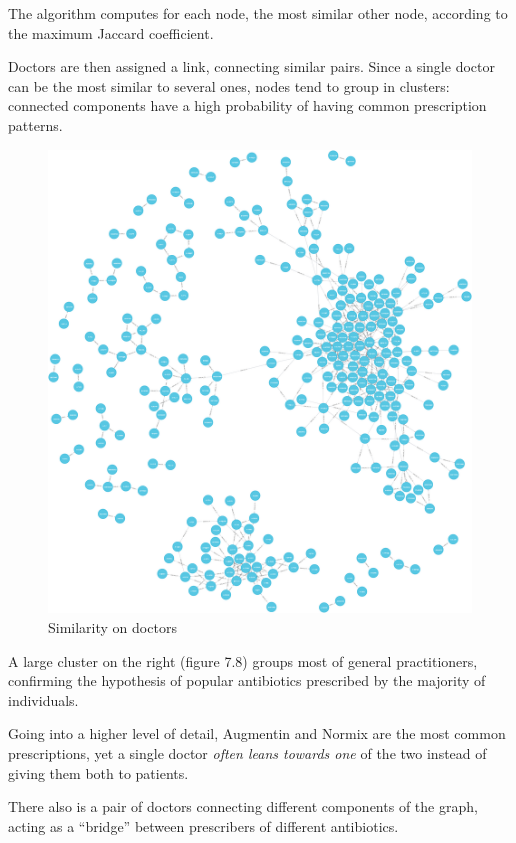 The algorithm computes for each node, the most similar other node, according to the maximum Jaccard coefficient.

Doctors are then assigned a link, connecting similar pairs. Since a single doctor can be the most similar to several ones, nodes tend to group in clusters: connected components have a high probability of having common prescription patterns. 

\begin{figure}[h]
	\centering
	\includegraphics[scale=0.15]{./images/similarity-doctors.png}
	\caption{\small Similarity on doctors}
\end{figure}

A large cluster on the right (figure 7.8) groups most of general practitioners, confirming the hypothesis of popular antibiotics prescribed by the majority of individuals.

Going into a higher level of detail, Augmentin and Normix are the most common prescriptions, yet a single doctor \textit{often leans towards one} of the two instead of giving them both to patients. 

There also is a pair of doctors connecting different components of the graph, acting as a ``bridge'' between prescribers of different antibiotics.


